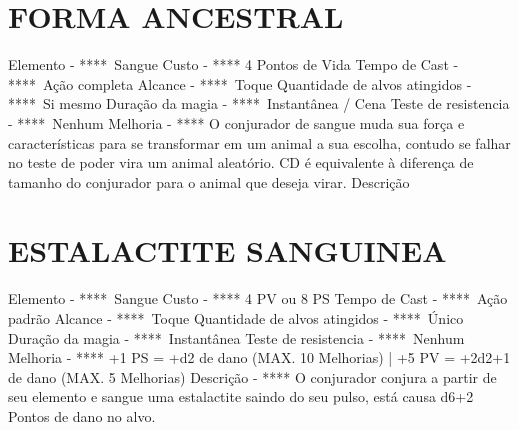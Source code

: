 \documentclass{article}%
\begin{document}
\section{FORMA ANCESTRAL}%
\label{sec:FORMAANCESTRAL}%
Elemento {-} ****~Sangue\newline%
Custo {-} **** 4 Pontos de Vida\newline%
Tempo de Cast {-} ****~Ação completa\newline%
Alcance {-} ****~Toque\newline%
Quantidade de alvos atingidos {-} ****~Si mesmo\newline%
Duração da magia {-} ****~Instantânea / Cena\newline%
Teste de resistencia {-} ****~Nenhum\newline%
Melhoria {-} **** O conjurador de sangue muda sua força e características para se transformar em um animal a sua escolha, contudo se falhar no teste de poder vira um animal aleatório. CD é equivalente à diferença de tamanho do conjurador para o animal que deseja virar.\newline%
Descrição \newline%

%
\section{ESTALACTITE SANGUINEA}%
\label{sec:ESTALACTITESANGUINEA}%
Elemento {-} ****~Sangue\newline%
Custo {-} **** 4 PV ou 8 PS\newline%
Tempo de Cast {-} ****~Ação padrão\newline%
Alcance {-} ****~Toque\newline%
Quantidade de alvos atingidos {-} ****~Único\newline%
Duração da magia {-} ****~Instantânea\newline%
Teste de resistencia {-} ****~Nenhum\newline%
Melhoria {-} **** +1 PS = +d2 de dano (MAX. 10 Melhorias) | +5 PV = +2d2+1 de dano (MAX. 5 Melhorias)\newline%
Descrição {-} **** O conjurador conjura a partir de seu elemento e sangue uma estalactite saindo do seu pulso, está causa d6+2 Pontos de dano no alvo.\newline%

%
\end{document}
